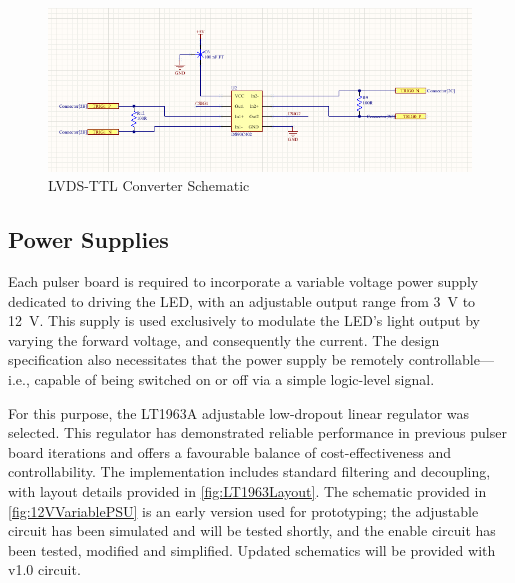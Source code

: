 \documentclass[a4paper,11pt]{article}
\begin{document}
\begin{figure}[htbp]
\centering
\includegraphics[scale=0.8]{LVDS-TTL Converter.png}
\caption{LVDS-TTL Converter Schematic\label{fig:lvdsttl}}
\end{figure}


\subsection{Power Supplies}\label{sec:LEDpower}

Each pulser board is required to incorporate a variable voltage power supply dedicated to driving the LED, with an adjustable output range from 3~V to 12~V. This supply is used exclusively to modulate the LED’s light output by varying the forward voltage, and consequently the current. The design specification also necessitates that the power supply be remotely controllable—i.e., capable of being switched on or off via a simple logic-level signal.

For this purpose, the LT1963A \cite{LT1963} adjustable low-dropout linear regulator was selected. This regulator has demonstrated reliable performance in previous pulser board iterations and offers a favourable balance of cost-effectiveness and controllability. The implementation includes standard filtering and decoupling, with layout details provided in \cref{fig:LT1963Layout}. The schematic provided in \cref{fig:12VVariablePSU} is an early version used for prototyping; the adjustable circuit has been simulated and will be tested shortly, and the enable circuit has been tested, modified and simplified. Updated schematics will be provided with v1.0 circuit.
\end{document}

